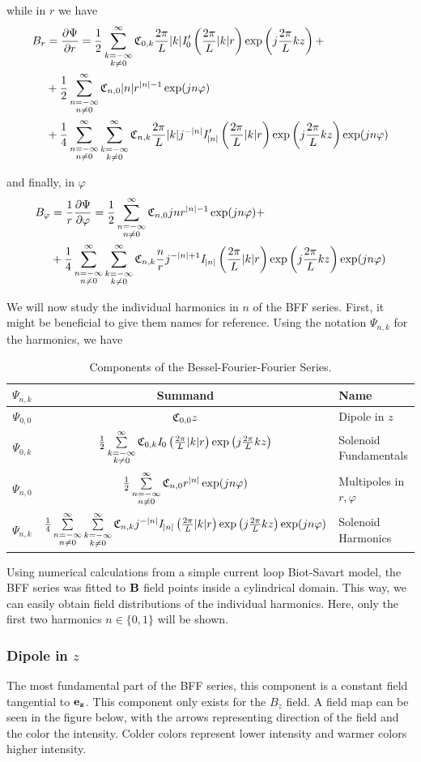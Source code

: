 while in $r$ we have
\begin{equation}
    \begin{split}
        B_r &= \frac{\partial \Psi}{\partial r} =
        \Bffrok + \\ &+ \Bffrno \\ &+\Bffrnk
    \end{split}
\end{equation}

and finally, in $\varphi$
\begin{equation}
    \begin{split}
        B_\varphi &= \frac{1}{r}
        \frac{\partial \Psi}{\partial \varphi} = \Bffpno +\\
        &+ \Bffpnk
    \end{split}
\end{equation}

We will now study the individual harmonics in $n$ of the
BFF series. First, it might be beneficial to give them
names for reference. Using the notation $\Psi_{n,k}$
for the harmonics, we have

\begin{table}[!h]
    \centering
    \begin{tabular}{c c p{2cm}}
        $\Psi_{n,k}$ & Summand      & Name                       \\ \hline
        $\Psi_{0,0}$ & $\Cnk[0,0]z$ & Dipole in $z$              \\
        $\Psi_{0,k}$ & $\Bffok$     & Solenoid Fundamentals      \\
        $\Psi_{n,0}$ & $\Bffno$     & Multipoles in $r, \varphi$ \\
        $\Psi_{n,k}$ & $\Bffnk$     & Solenoid Harmonics
    \end{tabular}
    \caption{Components of the Bessel-Fourier-Fourier Series.}
    \label{tab:BFF-components}
\end{table}

Using numerical calculations from a simple current loop
Biot-Savart model, the BFF series was fitted to $\vb{B}$
field points inside a cylindrical domain. This way, we
can easily obtain field distributions of the individual harmonics.
Here, only the first two harmonics $n\in\{0,1\}$ will be
shown.

\subsubsection{Dipole in $z$}
The most fundamental part of the BFF series, this component
is a constant field tangential to $\ez$. This component
only exists for the $B_z$ field. A field map can
be seen in the figure below, with the arrows representing
direction of the field and the color the intensity. Colder
colors represent lower intensity and warmer colors higher
intensity.

